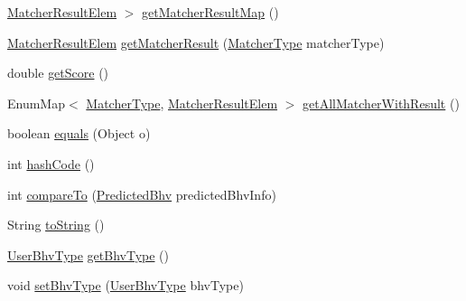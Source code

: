 \begin{DoxyCompactItemize}
\hyperlink{classlab_1_1davidahn_1_1appshuttle_1_1predict_1_1matcher_1_1_matcher_result_elem}{\-Matcher\-Result\-Elem} $>$ \hyperlink{classlab_1_1davidahn_1_1appshuttle_1_1predict_1_1_predicted_bhv_a785e00e844c2213d95d32a71d55484d6}{get\-Matcher\-Result\-Map} ()
\item 
\hyperlink{classlab_1_1davidahn_1_1appshuttle_1_1predict_1_1matcher_1_1_matcher_result_elem}{\-Matcher\-Result\-Elem} \hyperlink{classlab_1_1davidahn_1_1appshuttle_1_1predict_1_1_predicted_bhv_a01795ffd14fa97a2d1cfcfd5c70e86c3}{get\-Matcher\-Result} (\hyperlink{enumlab_1_1davidahn_1_1appshuttle_1_1predict_1_1matcher_1_1_matcher_type}{\-Matcher\-Type} matcher\-Type)
\item 
double \hyperlink{classlab_1_1davidahn_1_1appshuttle_1_1predict_1_1_predicted_bhv_a2867689f6721fc93999376b631071d84}{get\-Score} ()
\item 
\-Enum\-Map$<$ \hyperlink{enumlab_1_1davidahn_1_1appshuttle_1_1predict_1_1matcher_1_1_matcher_type}{\-Matcher\-Type}, \*
\hyperlink{classlab_1_1davidahn_1_1appshuttle_1_1predict_1_1matcher_1_1_matcher_result_elem}{\-Matcher\-Result\-Elem} $>$ \hyperlink{classlab_1_1davidahn_1_1appshuttle_1_1predict_1_1_predicted_bhv_a2e03ee2e686369194ed6abd67e6c8747}{get\-All\-Matcher\-With\-Result} ()
\item 
boolean \hyperlink{classlab_1_1davidahn_1_1appshuttle_1_1predict_1_1_predicted_bhv_aebedebd3688e3d56490a8428587b0e86}{equals} (\-Object o)
\item 
int \hyperlink{classlab_1_1davidahn_1_1appshuttle_1_1predict_1_1_predicted_bhv_aba9b938759b9db6833432017c46a49be}{hash\-Code} ()
\item 
int \hyperlink{classlab_1_1davidahn_1_1appshuttle_1_1predict_1_1_predicted_bhv_a5b58f32a04bf0d96fafd4ab3f7f7ca03}{compare\-To} (\hyperlink{classlab_1_1davidahn_1_1appshuttle_1_1predict_1_1_predicted_bhv}{\-Predicted\-Bhv} predicted\-Bhv\-Info)
\item 
\-String \hyperlink{classlab_1_1davidahn_1_1appshuttle_1_1predict_1_1_predicted_bhv_a996ec9117f9fc306814e3bad1dff9a9e}{to\-String} ()
\item 
\hyperlink{enumlab_1_1davidahn_1_1appshuttle_1_1collect_1_1bhv_1_1_user_bhv_type}{\-User\-Bhv\-Type} \hyperlink{classlab_1_1davidahn_1_1appshuttle_1_1predict_1_1_predicted_bhv_ad10d4ec73e0ecb3e34cbba1cfc6e30c1}{get\-Bhv\-Type} ()
\item 
void \hyperlink{classlab_1_1davidahn_1_1appshuttle_1_1predict_1_1_predicted_bhv_ab86d25f74264b485f1b2e90f3750dcb4}{set\-Bhv\-Type} (\hyperlink{enumlab_1_1davidahn_1_1appshuttle_1_1collect_1_1bhv_1_1_user_bhv_type}{\-User\-Bhv\-Type} bhv\-Type)

\end{DoxyCompactItemize}
